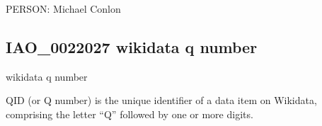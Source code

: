 \documentclass[letterpaper,10pt,english]{sphinxmanual}
\begin{document}
\begin{sphinxShadowBox}

\sphinxAtStartPar
{}
\end{sphinxShadowBox}

\begin{sphinxShadowBox}

\sphinxAtStartPar
PERSON: Michael Conlon
\end{sphinxShadowBox}
\begin{quote}

\ignorespaces \end{quote}


\subsection{IAO\_0022027 \sphinxhyphen{} wikidata q number}
\label{\detokenize{doc-IAO_0022027:iao-0022027-wikidata-q-number}}\label{\detokenize{doc-IAO_0022027:index-0}}\label{\detokenize{doc-IAO_0022027::doc}}
\begin{sphinxShadowBox}

\sphinxAtStartPar
wikidata q number
\end{sphinxShadowBox}

\begin{sphinxShadowBox}

\sphinxAtStartPar
QID (or Q number) is the unique identifier of a data item on Wikidata, comprising the letter “Q” followed by one or more digits.
\end{sphinxShadowBox}

\begin{sphinxShadowBox}

\sphinxAtStartPar
{}
\end{sphinxShadowBox}

\begin{sphinxShadowBox}

\sphinxAtStartPar
{}
\end{sphinxShadowBox}
\end{document}
